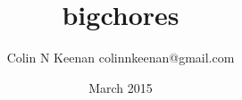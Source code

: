 \documentclass[12pt,letterpaper]{article}
\begin{document}
\title{bigchores{}}
\author{Colin N Keenan colinnkeenan@gmail.com}
\date{March 2015}
\section*{\bigchores}



\end{document}

